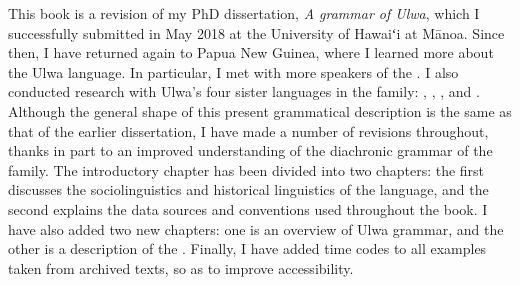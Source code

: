 \addchap{\lsPrefaceTitle}
This book is a revision of my PhD dissertation, \textit{A grammar of Ulwa}, which I successfully submitted in May 2018 at the University of Hawaiʻi at Mānoa. Since then, I have returned again to Papua New Guinea, where I learned more about the Ulwa language. In particular, I met with more speakers of the  . I also conducted research with Ulwa’s four sister languages in the  family: , , , and . Although the general shape of this present grammatical description is the same as that of the earlier dissertation, I have made a number of revisions throughout, thanks in part to an improved understanding of the diachronic grammar of the  family. The introductory chapter has been divided into two chapters: the first discusses the sociolinguistics and historical linguistics of the language, and the second explains the data sources and conventions used throughout the book. I have also added two new chapters: one is an overview of Ulwa grammar, and the other is a description of the  . Finally, I have added time codes to all examples taken from archived texts, so as to improve accessibility.

